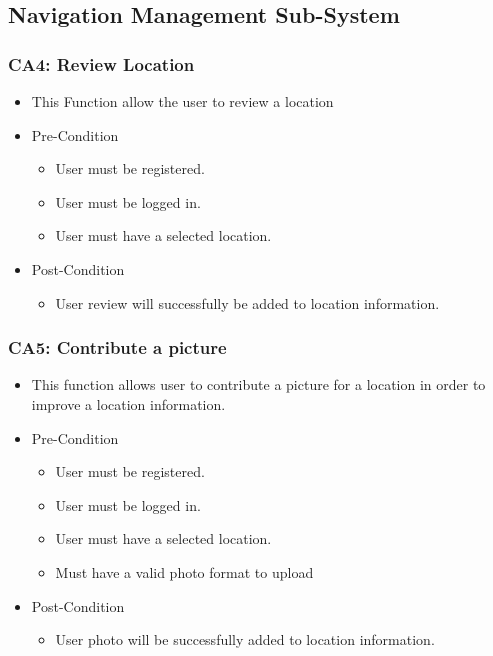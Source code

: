 \documentclass[12pt,a4paper]{article}
\begin{document}
	\subsection{Navigation Management Sub-System}
		\subsubsection{CA4: Review Location}
			\begin{itemize}
				\item This Function allow the user to review a location
				\item Pre-Condition
					\begin{itemize}
						\item User must be registered.
						\item User must be logged in.
						\item User must have a selected location.
					\end{itemize}
				\item Post-Condition
					\begin{itemize}
						\item User review will successfully be added to location information.
					\end{itemize}

			\end{itemize}
		\subsubsection{CA5: Contribute a picture}
			\begin{itemize}
				\item This function allows user to contribute a picture for a location in order to improve a location information.
				\item Pre-Condition
					\begin{itemize}
						\item User must be registered.
						\item User must be logged in.
						\item User must have a selected location.
						\item Must have a valid photo format to upload
					\end{itemize}
				\item Post-Condition
					\begin{itemize}
						\item User photo will be successfully added to location information.
					\end{itemize}
			\end{itemize}
\end{document}
